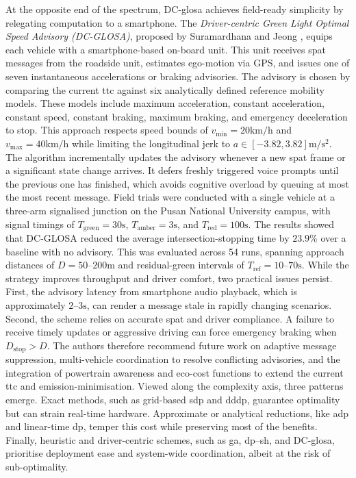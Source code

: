 \mynewline
At the opposite end of the spectrum, DC-\ac{glosa} achieves field-ready simplicity by relegating computation to a smartphone. The \textit{Driver-centric Green Light Optimal Speed Advisory (DC-GLOSA)}, proposed by Suramardhana and Jeong \cite{Suramardhana2014}, equips each vehicle with a smartphone-based on-board unit. This unit receives \ac{spat} messages from the roadside unit, estimates ego-motion via GPS, and issues one of seven instantaneous accelerations or braking advisories. The advisory is chosen by comparing the current \ac{ttc} against six analytically defined reference mobility models. These models include maximum acceleration, constant acceleration, constant speed, constant braking, maximum braking, and emergency deceleration to stop. This approach respects speed bounds of $v_{\min}=20\unit{\kilo\metre\per\hour}$ and $v_{\max}=40\unit{\kilo\metre\per\hour}$ while limiting the longitudinal jerk to $a\in[-3.82, 3.82]\unit{\metre\per\second\squared}$. The algorithm incrementally updates the advisory whenever a new \ac{spat} frame or a significant state change arrives. It defers freshly triggered voice prompts until the previous one has finished, which avoids cognitive overload by queuing at most the most recent message.
Field trials were conducted with a single vehicle at a three-arm signalised junction on the Pusan National University campus, with signal timings of $T_{\text{green}}=30\unit{\second}$, $T_{\text{amber}}=3\unit{\second}$, and $T_{\text{red}}=100\unit{\second}$. The results showed that DC-GLOSA reduced the average intersection-stopping time by $23.9\%$ over a baseline with no advisory. This was evaluated across 54 runs, spanning approach distances of $D=50\text{--}200\unit{\metre}$ and residual-green intervals of $T_{\text{ref}}=10\text{--}70\unit{\second}$. While the strategy improves throughput and driver comfort, two practical issues persist. First, the advisory latency from smartphone audio playback, which is approximately $2$--$3\unit{\second}$, can render a message stale in rapidly changing scenarios. Second, the scheme relies on accurate \ac{spat} and driver compliance. A failure to receive timely updates or aggressive driving can force emergency braking when $D_{\text{stop}}>D$. The authors therefore recommend future work on adaptive message suppression, multi-vehicle coordination to resolve conflicting advisories, and the integration of powertrain awareness and eco-cost functions to extend the current \ac{ttc} and emission-minimisation.
\mynewline
Viewed along the complexity axis, three patterns emerge. Exact methods, such as grid-based \ac{sdp} and \ac{dddp}, guarantee optimality but can strain real-time hardware. Approximate or analytical reductions, like \ac{adp} and linear-time \ac{dp}, temper this cost while preserving most of the benefits. Finally, heuristic and driver-centric schemes, such as \ac{ga}, \ac{dp}–\ac{sh}, and DC-\ac{glosa}, prioritise deployment ease and system-wide coordination, albeit at the risk of sub-optimality.

